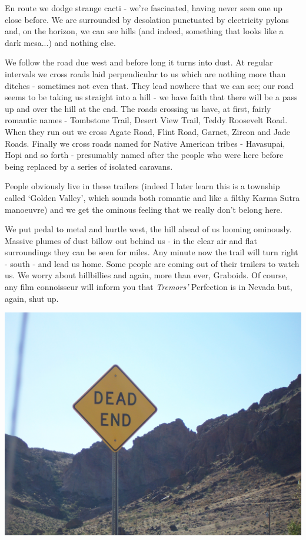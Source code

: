 \documentclass[a5paper,titlepage,11pt]{book}
\begin{document}
En route we dodge strange cacti - we're fascinated, having never seen one up close before.  We are surrounded by desolation punctuated by electricity pylons and, on the horizon, we can see hills (and indeed, something that looks like a dark mesa...) and nothing else.

We follow the road due west and before long it turns into dust.  At regular intervals we cross roads laid perpendicular to us which are nothing more than ditches - sometimes not even that.  They lead nowhere that we can see; our road seems to be taking us straight into a hill - we have faith that there will be a pass up and over the hill at the end.  The roads crossing us have, at first, fairly romantic names - Tombstone Trail, Desert View Trail, Teddy Roosevelt Road.  When they run out we cross Agate Road, Flint Road, Garnet, Zircon and Jade Roads.  Finally we cross roads named for Native American tribes - Havasupai, Hopi and so forth - presumably named after the people who were here before being replaced by a series of isolated caravans. 

People obviously live in these trailers (indeed I later learn this is a township called `Golden Valley', which sounds both romantic and like a filthy Karma Sutra manoeuvre) and we get the ominous feeling that we really don't belong here.

We put pedal to metal and hurtle west, the hill ahead of us looming ominously.  Massive plumes of dust billow out behind us - in the clear air and flat surroundings they can be seen for miles.  Any minute now the trail will turn right - south - and lead us home.  Some people are coming out of their trailers to watch us.  We worry about hillbillies and again, more than ever, Graboids.  Of course, any film connoisseur will inform you that \emph{Tremors'} Perfection is in Nevada but, again, shut up.

\begin{center}\includegraphics[width=\textwidth]{gfx/100_1536}\end{center}
\end{document}

